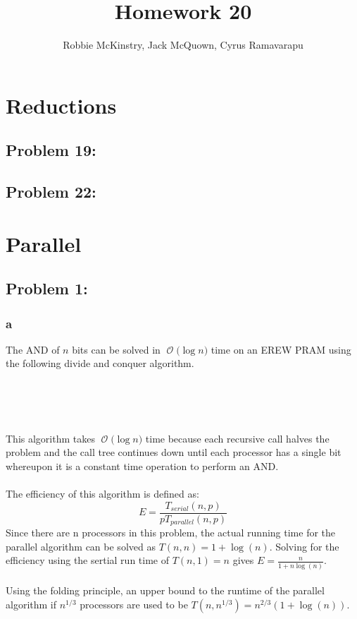 \documentclass[12pt]{article}
\newcommand{\BigO}[1]{\ensuremath{\operatorname{\mathcal{O}}\bigl(#1\bigr)}}
\begin{document}
\title{Homework 20}
\author{Robbie McKinstry, Jack McQuown, Cyrus Ramavarapu}
\renewcommand{\today}{18 September 2016}
\renewcommand{\baselinestretch}{1.5}
\maketitle

\section*{Reductions}
\subsection*{Problem 19: }
\subsection*{Problem 22: }

\section*{Parallel}
\subsection*{Problem 1: }
\subsubsection*{a}
The AND of $n$ bits can be solved in \BigO{\log n} time on an
EREW PRAM using the following divide and conquer algorithm.\\\\
\begin{algorithm}[H]
\\
\\
{}
\end{algorithm}
This algorithm takes \BigO{\log n} time because each recursive
call halves the problem and the call tree continues down until 
each processor has a single bit whereupon it is a constant
time operation to perform an AND.\\\\
The efficiency of this algorithm is defined as:
\[
E=\frac{T_{serial}(n,p)}{pT_{parallel}(n,p)}
\]
Since there are n processors in this problem, the actual running
time for the parallel algorithm can be solved as $T(n,n) = 1 + \log(n)$.
Solving for the efficiency using the sertial run time of $T(n,1) = n$
gives $E=\frac{n}{1+n\log(n)}$.\\\\
Using the folding principle, an upper bound to the runtime of the parallel
algorithm if $n^{1/3}$ processors are used to be $T(n,n^{1/3})=n^{2/3}(1+\log(n))$.
\end{document}
